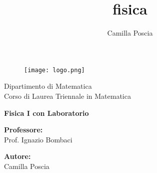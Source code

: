 \documentclass[italian,11pt,a4paper]{article}
\title{fisica}
\author{Camilla Poscia}
\begin{document}
\begin{titlepage} 
\begin{figure}
	\centering
	\texttt{[image: logo.png]}
	\label{fig:marchiounipipant541}
\end{figure}

	\vspace{20mm}
	
	\begin{Large}
		\begin{center}
			Dipartimento di Matematica\\ Corso di Laurea Triennale in Matematica\\
			\vspace{30mm}
		
			{\huge{\bf Fisica I con Laboratorio}}\\
		\end{center}
	\end{Large}
	
	\vspace{7,5 cm}

	\begin{minipage}[t]{0.47\textwidth}
		{\large{\bf Professore:}\\ \large{Prof. Ignazio Bombaci}}
	\end{minipage}
	\hfill
	\begin{minipage}[t]{0.47\textwidth}\raggedleft
		{\large{\bf Autore:}\\ \large{Camilla Poscia}}
	\end{minipage}
	
	\vspace{25mm}
	
	\hrulefill
	
	\vspace{5mm}
	
	
\end{titlepage}
\end{document}
